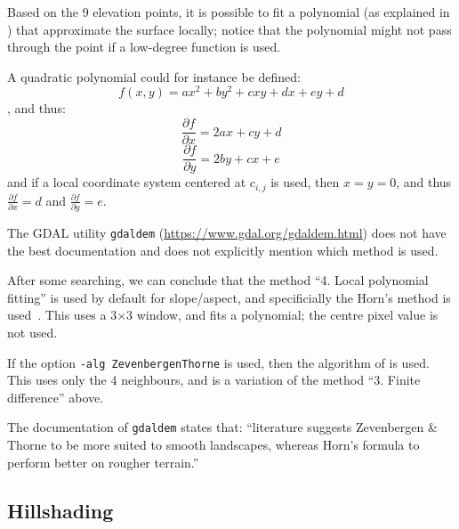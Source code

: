 Based on the 9 elevation points, it is possible to fit a polynomial (as explained in ) that approximate the surface locally; notice that the polynomial might not pass through the point if a low-degree function is used.

A quadratic polynomial could for instance be defined:
\begin{equation}
  f(x,y) = ax^2 + by^2 + cxy + dx + ey +d
\end{equation}
, and thus:
\begin{equation}
  \frac{\partial f}{\partial x} = 2ax + cy + d
\end{equation}
\begin{equation}
  \frac{\partial f}{\partial y} = 2by + cx + e
\end{equation}
and if a local coordinate system centered at $c_{i,j}$ is used, then $x = y = 0$, and thus $\frac{\partial f}{\partial x} = d$ and $\frac{\partial f}{\partial y} = e$.


\begin{kaobox}[frametitle=\faCog\ How does it work in practice?]
  The GDAL utility \texttt{gdaldem} (\url{https://www.gdal.org/gdaldem.html}) does not have the best documentation and does not explicitly mention which method is used.

  After some searching, we can conclude that the method ``4. Local polynomial fitting'' is used by default for slope/aspect, and specificially the Horn's method is used~\citep{Horn81}.
  This uses a 3$\times$3 window, and fits a polynomial; the centre pixel value is not used.

  If the option \texttt{-alg ZevenbergenThorne} is used, then the algorithm of \citet{Zevenbergen87} is used. 
  This uses only the 4 neighbours, and is a variation of the method ``3. Finite difference'' above.

  The documentation of \texttt{gdaldem} states that: ``literature suggests Zevenbergen \& Thorne to be more suited to smooth landscapes, whereas Horn's formula to perform better on rougher terrain.''
\end{kaobox}

\subsection{Hillshading}%

